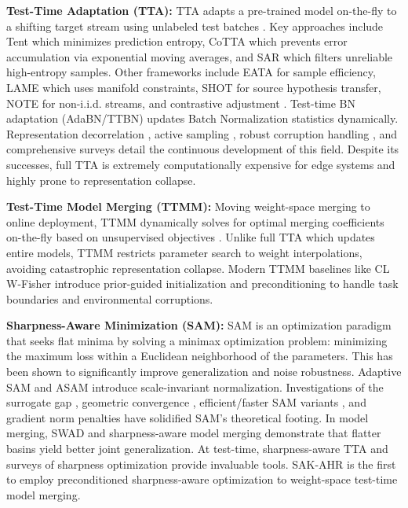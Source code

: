 \documentclass{article}
\theoremstyle{plain}
\theoremstyle{definition}
\theoremstyle{remark}
\begin{document}
\textbf{Test-Time Adaptation (TTA):} TTA adapts a pre-trained model on-the-fly to a shifting target stream using unlabeled test batches \citep{wang2021tent}. Key approaches include Tent \citep{wang2021tent} which minimizes prediction entropy, CoTTA \citep{wang2022cotta} which prevents error accumulation via exponential moving averages, and SAR \citep{niu2022sar} which filters unreliable high-entropy samples. Other frameworks include EATA \citep{niu2023eata} for sample efficiency, LAME \citep{boudiaf2022lame} which uses manifold constraints, SHOT \citep{liang2020shot} for source hypothesis transfer, NOTE \citep{zhao2023note} for non-i.i.d. streams, and contrastive adjustment \citep{iwasawa2021contrastive}. Test-time BN adaptation (AdaBN/TTBN) \citep{lim2023ttn} updates Batch Normalization statistics dynamically. Representation decorrelation \citep{gan2023decor}, active sampling \citep{shao2023active}, robust corruption handling \citep{dobler2023robust, yuan2023robust}, and comprehensive surveys \citep{khurana2024unsupervised, singh2024continual} detail the continuous development of this field. Despite its successes, full TTA is extremely computationally expensive for edge systems and highly prone to representation collapse.

\textbf{Test-Time Model Merging (TTMM):} Moving weight-space merging to online deployment, TTMM dynamically solves for optimal merging coefficients on-the-fly based on unsupervised objectives \citep{yang2024ttmm}. Unlike full TTA which updates entire models, TTMM restricts parameter search to weight interpolations, avoiding catastrophic representation collapse. Modern TTMM baselines like CL W-Fisher \citep{hubotter2026ttmm} introduce prior-guided initialization and preconditioning to handle task boundaries and environmental corruptions.

\textbf{Sharpness-Aware Minimization (SAM):} SAM \citep{foret2021sam} is an optimization paradigm that seeks flat minima by solving a minimax optimization problem: minimizing the maximum loss within a Euclidean neighborhood of the parameters. This has been shown to significantly improve generalization and noise robustness. Adaptive SAM \citep{wu2021asam} and ASAM \citep{kwon2021asam} introduce scale-invariant normalization. Investigations of the surrogate gap \citep{zhuang2022surrogate}, geometric convergence \citep{andriushchenko2022understanding}, efficient/faster SAM variants \citep{du2022efficient, mi2022make}, and gradient norm penalties \citep{zhao2022penalizing} have solidified SAM's theoretical footing. In model merging, SWAD \citep{cha2022swad} and sharpness-aware model merging \citep{wen2023sharpness} demonstrate that flatter basins yield better joint generalization. At test-time, sharpness-aware TTA \citep{liu2023sharpness} and surveys of sharpness optimization \citep{bahri2022sharpness, muller2023flatness} provide invaluable tools. SAK-AHR is the first to employ preconditioned sharpness-aware optimization to weight-space test-time model merging.
\end{document}
